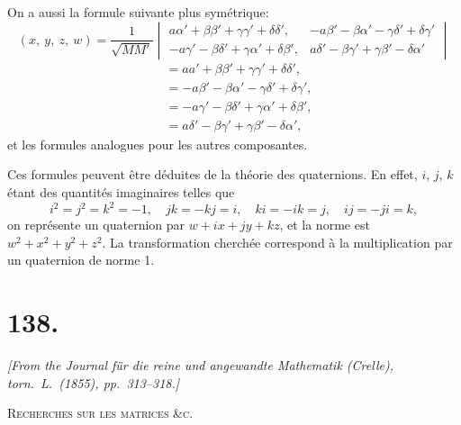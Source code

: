 \documentclass[12pt,a4paper]{article}
\begin{document}
\newpage
\setcounter{page}{215}

On a aussi la formule suivante plus sym\'{e}trique:
\[
(x,\ y,\ z,\ w) =
\frac{1}{\sqrt{MM'}}
\begin{vmatrix}
a\alpha' + \beta\beta' + \gamma\gamma' + \delta\delta', &
-a\beta' - \beta\alpha' - \gamma\delta' + \delta\gamma' \\
-a\gamma' - \beta\delta' + \gamma\alpha' + \delta\beta', &
a\delta' - \beta\gamma' + \gamma\beta' - \delta\alpha'
\end{vmatrix}
\]
\[
\begin{aligned}
&= aa' + \beta\beta' + \gamma\gamma' + \delta\delta', \\
&= -a\beta' - \beta\alpha' - \gamma\delta' + \delta\gamma', \\
&= -a\gamma' - \beta\delta' + \gamma\alpha' + \delta\beta', \\
&= a\delta' - \beta\gamma' + \gamma\beta' - \delta\alpha',
\end{aligned}
\]
et les formules analogues pour les autres composantes.

\newpage
\setcounter{page}{216}

Ces formules peuvent \^{e}tre d\'{e}duites de la th\'{e}orie des quaternions. En effet, $i$, $j$, $k$ \'{e}tant des quantit\'{e}s imaginaires telles que
\[
i^2 = j^2 = k^2 = -1,\quad jk = -kj = i,\quad ki = -ik = j,\quad ij = -ji = k,
\]
on repr\'{e}sente un quaternion par $w + ix + jy + kz$, et la norme est $w^2 + x^2 + y^2 + z^2$. La transformation cherch\'{e}e correspond \`{a} la multiplication par un quaternion de norme 1.

\newpage
\setcounter{page}{217}


\section*{138.}

\begin{flushright}
\textit{[From the Journal f\"{u}r die reine und angewandte Mathematik (Crelle),}\\
\textit{torn.\ L.\ (1855), pp.\ 313--318.]}
\end{flushright}

\textsc{Recherches sur les matrices \&c.}
\end{document}
